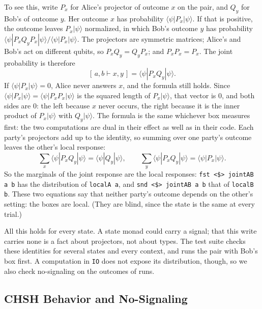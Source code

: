 \documentclass[11pt]{article}
\newcommand{\hs}{\lstinline[style=hask,basicstyle=\ttfamily,frame=none]}
\newcommand{\pr}[2]{[\,#1 \vdash #2\,]}
\begin{document}
To see this, write $P_x$ for Alice's projector of outcome $x$ on the pair, and $Q_y$ for Bob's of outcome $y$. Her outcome $x$ has probability $\langle\psi|P_x|\psi\rangle$. If that is positive, the outcome leaves $P_x|\psi\rangle$ normalized, in which Bob's outcome $y$ has probability $\langle\psi|P_x Q_y P_x|\psi\rangle / \langle\psi|P_x|\psi\rangle$. The projectors are symmetric matrices; Alice's and Bob's act on different qubits, so $P_x Q_y = Q_y P_x$; and $P_x P_x = P_x$. The joint probability is therefore
\[
  \pr{a, b}{x, y} = \langle\psi|P_x Q_y|\psi\rangle.
\]
If $\langle\psi|P_x|\psi\rangle = 0$, Alice never answers $x$, and the formula still holds. Since $\langle\psi|P_x|\psi\rangle = \langle\psi|P_x P_x|\psi\rangle$ is the squared length of $P_x|\psi\rangle$, that vector is $0$, and both sides are $0$: the left because $x$ never occurs, the right because it is the inner product of $P_x|\psi\rangle$ with $Q_y|\psi\rangle$. The formula is the same whichever box measures first: the two computations are dual in their effect as well as in their code. Each party's projectors add up to the identity, so summing over one party's outcome leaves the other's local response:
\[
  \sum_x \langle\psi|P_x Q_y|\psi\rangle = \langle\psi|Q_y|\psi\rangle, \qquad
  \sum_y \langle\psi|P_x Q_y|\psi\rangle = \langle\psi|P_x|\psi\rangle.
\]
So the marginals of the joint response are the local responses: \hs|fst <$> jointAB a b| has the distribution of \hs|localA a|, and \hs|snd <$> jointAB a b| that of \hs|localB b|. These two equations say that neither party's outcome depends on the other's setting: the boxes are local. (They are blind, since the state is the same at every trial.)

All this holds for every state. A state monad could carry a signal; that this write carries none is a fact about projectors, not about types. The test suite checks these identities for several states and every context, and runs the pair with Bob's box first. A computation in \hs|IO| does not expose its distribution, though, so we also check no-signaling on the outcomes of runs.

\subsection{CHSH Behavior and No-Signaling}\label{sec:quantum-ns}
\end{document}
